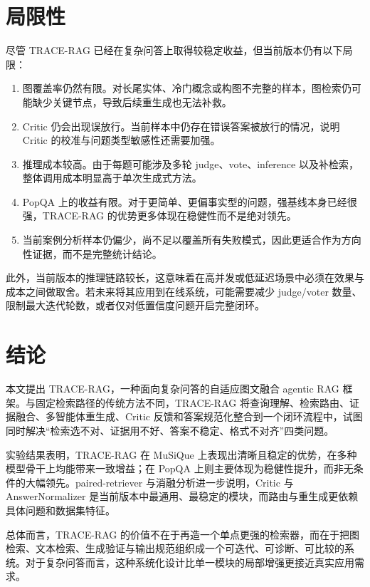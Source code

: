 ﻿\documentclass[UTF8,11pt,twocolumn]{ctexart}
\begin{document}
\section{局限性}

尽管 TRACE-RAG 已经在复杂问答上取得较稳定收益，但当前版本仍有以下局限：

\begin{enumerate}[leftmargin=1.5em]
  \item 图覆盖率仍然有限。对长尾实体、冷门概念或构图不完整的样本，图检索仍可能缺少关键节点，导致后续重生成也无法补救。
  \item Critic 仍会出现误放行。当前样本中仍存在错误答案被放行的情况，说明 Critic 的校准与问题类型敏感性还需要加强。
  \item 推理成本较高。由于每题可能涉及多轮 judge、vote、inference 以及补检索，整体调用成本明显高于单次生成式方法。
  \item PopQA 上的收益有限。对于更简单、更偏事实型的问题，强基线本身已经很强，TRACE-RAG 的优势更多体现在稳健性而不是绝对领先。
  \item 当前案例分析样本仍偏少，尚不足以覆盖所有失败模式，因此更适合作为方向性证据，而不是完整统计结论。
\end{enumerate}

此外，当前版本的推理链路较长，这意味着在高并发或低延迟场景中必须在效果与成本之间做取舍。若未来将其应用到在线系统，可能需要减少 judge/voter 数量、限制最大迭代轮数，或者仅对低置信度问题开启完整闭环。

\section{结论}

本文提出 TRACE-RAG，一种面向复杂问答的自适应图文融合 agentic RAG 框架。与固定检索路径的传统方法不同，TRACE-RAG 将查询理解、检索路由、证据融合、多智能体重生成、Critic 反馈和答案规范化整合到一个闭环流程中，试图同时解决“检索选不对、证据用不好、答案不稳定、格式不对齐”四类问题。

实验结果表明，TRACE-RAG 在 MuSiQue 上表现出清晰且稳定的优势，在多种模型骨干上均能带来一致增益；在 PopQA 上则主要体现为稳健性提升，而非无条件的大幅领先。paired-retriever 与消融分析进一步说明，Critic 与 AnswerNormalizer 是当前版本中最通用、最稳定的模块，而路由与重生成更依赖具体问题和数据集特征。

总体而言，TRACE-RAG 的价值不在于再造一个单点更强的检索器，而在于把图检索、文本检索、生成验证与输出规范组织成一个可迭代、可诊断、可比较的系统。对于复杂问答而言，这种系统化设计比单一模块的局部增强更接近真实应用需求。

\begingroup
\raggedright
\sloppy


\endgroup
\end{document}
